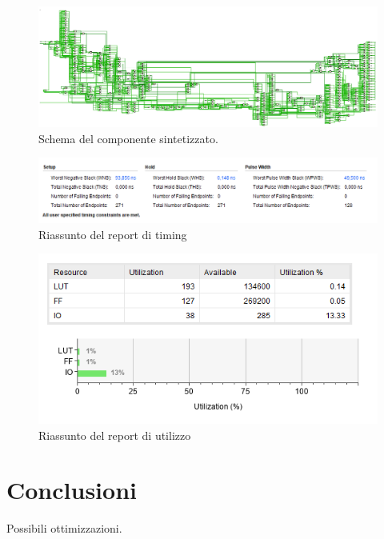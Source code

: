\documentclass{article}
\begin{document}
\begin{figure}[h]
    \includegraphics[width=\textwidth]{schema.png}
    \centering
    \caption{Schema del componente sintetizzato.}
\end{figure}

\begin{figure}[h]
    \includegraphics[width=\textwidth]{timing.png}
    \centering
    \caption{Riassunto del report di timing}
\end{figure}

\begin{figure}[h]
    \includegraphics[scale=0.5]{utilization.png}
    \centering
    \caption{Riassunto del report di utilizzo}
\end{figure}

\pagebreak
\section{Conclusioni}
Possibili ottimizzazioni.

\pagebreak
\printbibliography
\end{document}
